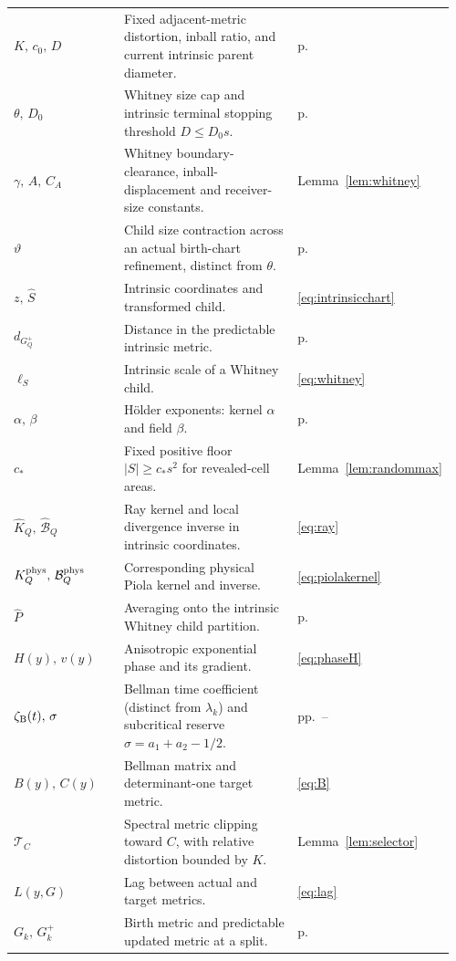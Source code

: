 \documentclass[11pt]{article}
\theoremstyle{definition}
\theoremstyle{remark}
\numberwithin{equation}{section}
\begin{document}
{\begin{longtable}{@{}p{0.285\linewidth}p{0.535\linewidth}p{0.14\linewidth}@{}}
$K,\,c_0,\,D$ & Fixed adjacent-metric distortion, inball ratio, and current intrinsic parent diameter. & p.~\pageref{not:Kconstant}\\
$\theta,\,D_0$ & Whitney size cap and intrinsic terminal stopping threshold $D\le D_0s$. & p.~\pageref{not:whitneyparameters}\\
$\gamma,\,A,\,C_A$ & Whitney boundary-clearance, inball-displacement and receiver-size constants. & Lemma~\ref{lem:whitney}\\
$\vartheta$ & Child size contraction across an actual birth-chart refinement, distinct from $\theta$. & p.~\pageref{not:whitneyparameters}\\
$z,\,\widehat S$ & Intrinsic coordinates and transformed child. & \eqref{eq:intrinsicchart}\\
$d_{G_Q^+}$ & Distance in the predictable intrinsic metric. & p.~\pageref{not:intrinsicdistance}\\
$\ell_S$ & Intrinsic scale of a Whitney child. & \eqref{eq:whitney}\\
$\alpha,\,\beta$ & H\"older exponents: kernel $\alpha$ and field $\beta$. & p.~\pageref{not:holderparameters}\\
$c_*$ & Fixed positive floor $|S|\ge c_*s^2$ for revealed-cell areas. & Lemma~\ref{lem:randommax}\\
$\widehat K_Q,\,\widehat{\mathcal B}_Q$ & Ray kernel and local divergence inverse in intrinsic coordinates. & \eqref{eq:ray}\\
$K_Q^{\rm phys},\,\mathcal B_Q^{\rm phys}$ & Corresponding physical Piola kernel and inverse. & \eqref{eq:piolakernel}\\
$\widehat P$ & Averaging onto the intrinsic Whitney child partition. & p.~\pageref{not:childprojector}\\
$H(y),\,v(y)$ & Anisotropic exponential phase and its gradient. & \eqref{eq:phaseH}\\
$\zeta_{\rm B}(t),\,\sigma$ & Bellman time coefficient (distinct from $\lambda_k$) and subcritical reserve $\sigma=a_1+a_2-1/2$. & pp.~\pageref{not:bellmanclock}--\pageref{not:bellmansigma}\\
$B(y),\,C(y)$ & Bellman matrix and determinant-one target metric. & \eqref{eq:B}\\
$\mathcal T_C$ & Spectral metric clipping toward $C$, with relative distortion bounded by $K$. & Lemma~\ref{lem:selector}\\
$L(y,G)$ & Lag between actual and target metrics. & \eqref{eq:lag}\\
$G_k,\,G_k^+$ & Birth metric and predictable updated metric at a split. & p.~\pageref{not:birthmetric}\\

\end{longtable}}
\end{document}
